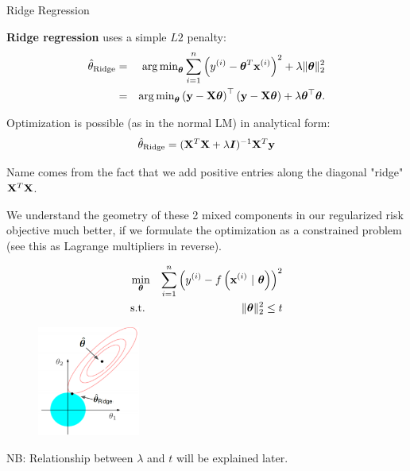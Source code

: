 \documentclass[11pt,compress,t,notes=noshow, xcolor=table]{beamer}
\begin{document}
\begin{vbframe}{Ridge Regression}

  \textbf{Ridge regression} uses a simple $L2$ penalty:
  \begin{eqnarray*}  
  \hat{\theta}_{\text{Ridge}} &=& \operatorname{arg\,min}_{\bm{\theta}} \sum\limits_{i=1}^n \left(y^{(i)} - \bm{\theta}^T \mathbf{x}^{(i)} \right)^2 + \lambda \|\bm{\theta}\|_2^2 \\
  &=& \operatorname{arg\,min}_{\bm{\theta}} \left(\mathbf{y} - \mathbf{X} \bm{\theta}\right)^\top \left(\mathbf{y} - \mathbf{X} \bm{\theta}\right) + \lambda \bm{\theta}^\top \bm{\theta}.
  \end{eqnarray*}

Optimization is possible (as in the normal LM) in analytical form:
$$\hat{\theta}_{\text{Ridge}} = ({\mathbf{X}}^T \mathbf{X}  + \lambda \boldsymbol{I})^{-1} \mathbf{X}^T\mathbf{y}$$

Name comes from the fact that we add positive entries along the diagonal "ridge" $\mathbf{X}^T \mathbf{X}$.

\framebreak 

We understand the geometry of these 2 mixed components in our regularized risk objective much better, if we formulate the optimization as a constrained problem (see this as Lagrange multipliers in reverse).

\vspace{-0.5cm}

\begin{eqnarray*}
\min_{\bm{\theta}} && \sum\limits_{i=1}^n \left(y^{(i)} - f\left(\mathbf{x}^{(i)} ~|~ \bm{\theta}\right)\right)^2 \\
  \text{s.t. } && \|\bm{\theta}\|_2^2  \leq t \\
\end{eqnarray*}

\vspace{-1.0cm}

\begin{figure}
\includegraphics[width=0.3\textwidth]{figure_man/ridge_hat.png}
\end{figure}

\begin{footnotesize} 
NB: Relationship between $\lambda$ and $t$ will be explained later.
\end{footnotesize}


\end{vbframe}
\end{document}
